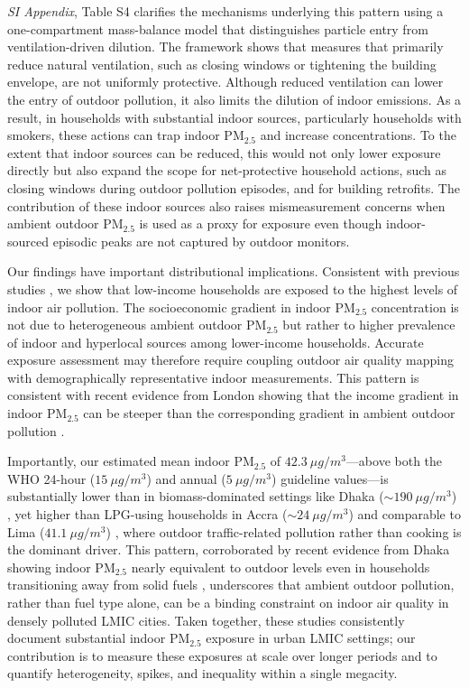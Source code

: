 \documentclass[9pt,twocolumn,twoside]{pnas-new}
\begin{document}
\textit{SI Appendix}, Table S4 clarifies the mechanisms underlying this pattern using a one-compartment mass-balance model that distinguishes particle entry from ventilation-driven dilution. The framework shows that measures that primarily reduce natural ventilation, such as closing windows or tightening the building envelope, are not uniformly protective. Although reduced ventilation can lower the entry of outdoor pollution, it also limits the dilution of indoor emissions. As a result, in households with substantial indoor sources, particularly households with smokers, these actions can trap indoor PM$_{2.5}$ and increase concentrations. To the extent that indoor sources can be reduced, this would not only lower exposure directly but also expand the scope for net-protective household actions, such as closing windows during outdoor pollution episodes, and for building retrofits. 
%
The contribution of these indoor sources also raises mismeasurement concerns when ambient outdoor PM$_{2.5}$ is used as a proxy for exposure even though indoor-sourced episodic peaks are not captured by outdoor monitors.

Our findings have important distributional implications. Consistent with previous studies \citep{greenstone_indoor_2021, burke_exposures_2022, ito_willingness_2020}, we show that low-income households are exposed to the highest levels of indoor air pollution. 
The socioeconomic gradient in indoor PM$_{2.5}$ concentration is not due to heterogeneous ambient outdoor PM$_{2.5}$ but rather to higher prevalence of indoor and hyperlocal sources among lower-income households. Accurate exposure assessment may therefore require coupling outdoor air quality mapping with demographically representative indoor measurements. This pattern is consistent with recent evidence from London showing that the income gradient in indoor PM$_{2.5}$ can be steeper than the corresponding gradient in ambient outdoor pollution \citep{metcalfe_making_2025}.

Importantly, our estimated mean indoor PM$_{2.5}$ of $42.3~\mu g/m^3$—above both the WHO 24-hour ($15~\mu g/m^3$) and annual ($5~\mu g/m^3$) guideline values—is substantially lower than in biomass-dominated settings like Dhaka ($\sim 190~\mu g/m^3$) \citep{GURLEY201311}, yet higher than LPG-using households in Accra ($\sim 24~\mu g/m^3$) \citep{zhou2011household} and comparable to Lima ($41.1~\mu g/m^3$) \citep{kephart2020indoor}, where outdoor traffic-related pollution rather than cooking is the dominant driver. This pattern, corroborated by recent evidence from Dhaka showing indoor PM$_{2.5}$ nearly equivalent to outdoor levels even in households transitioning away from solid fuels \citep{Sahaetal2025}, underscores that ambient outdoor pollution, rather than fuel type alone, can be a binding constraint on indoor air quality in densely polluted LMIC cities. Taken together, these studies consistently document substantial indoor PM$_{2.5}$ exposure in urban LMIC settings; our contribution is to measure these exposures at scale over longer periods and to quantify heterogeneity, spikes, and inequality within a single megacity.
\end{document}
